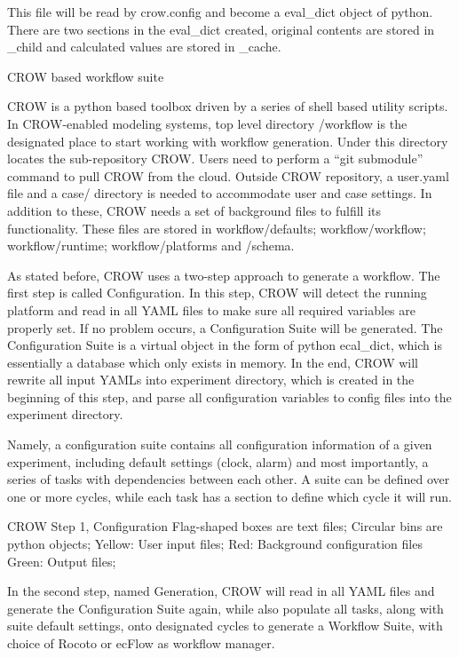 This file will be read by crow.\-config and become a eval\-\_\-dict object of python. There are two sections in the eval\-\_\-dict created, original contents are stored in \-\_\-child and calculated values are stored in \-\_\-cache.

C\-R\-O\-W based workflow suite

C\-R\-O\-W is a python based toolbox driven by a series of shell based utility scripts. In C\-R\-O\-W-\/enabled modeling systems, top level directory /workflow is the designated place to start working with workflow generation. Under this directory locates the sub-\/repository C\-R\-O\-W. Users need to perform a “git submodule” command to pull C\-R\-O\-W from the cloud. Outside C\-R\-O\-W repository, a user.\-yaml file and a case/ directory is needed to accommodate user and case settings. In addition to these, C\-R\-O\-W needs a set of background files to fulfill its functionality. These files are stored in workflow/defaults; workflow/workflow; workflow/runtime; workflow/platforms and /schema.

As stated before, C\-R\-O\-W uses a two-\/step approach to generate a workflow. The first step is called Configuration. In this step, C\-R\-O\-W will detect the running platform and read in all Y\-A\-M\-L files to make sure all required variables are properly set. If no problem occurs, a Configuration Suite will be generated. The Configuration Suite is a virtual object in the form of python ecal\-\_\-dict, which is essentially a database which only exists in memory. In the end, C\-R\-O\-W will rewrite all input Y\-A\-M\-Ls into experiment directory, which is created in the beginning of this step, and parse all configuration variables to config files into the experiment directory.

Namely, a configuration suite contains all configuration information of a given experiment, including default settings (clock, alarm) and most importantly, a series of tasks with dependencies between each other. A suite can be defined over one or more cycles, while each task has a section to define which cycle it will run.

C\-R\-O\-W Step 1, Configuration Flag-\/shaped boxes are text files; Circular bins are python objects; Yellow\-: User input files; Red\-: Background configuration files Green\-: Output files;

In the second step, named Generation, C\-R\-O\-W will read in all Y\-A\-M\-L files and generate the Configuration Suite again, while also populate all tasks, along with suite default settings, onto designated cycles to generate a Workflow Suite, with choice of Rocoto or ec\-Flow as workflow manager.


